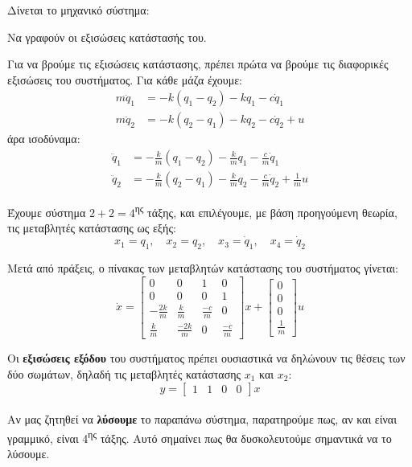 \documentclass[11pt,a4paper,notitlepage,fleqn]{article}
\let\mytodo\todo
\renewcommand{\todo}[1]{\par\mytodo[inline,noline]{#1}}
\begin{document}
\begin{exercise}
	Δίνεται το μηχανικό σύστημα:
	\todo{Graph 22}
	
	Να γραφούν οι εξισώσεις κατάστασής του.
	
	\tcblower
	
	Για να βρούμε τις εξισώσεις κατάστασης, πρέπει πρώτα να βρούμε τις
	διαφορικές εξισώσεις του συστήματος. Για κάθε μάζα έχουμε:
	\begin{align*}
		m\ddot q_1 &= -k(q_1-q_2) - kq_1-c\dot q_1\\
		m\ddot q_2 &= -k(q_2-q_1) - kq_2 -c\dot q_2 + u
	\end{align*}
	άρα ισοδύναμα:
	\begin{align}
	\ddot q_1 &= -\frac{k}{m}(q_1-q_2) - \frac{k}{m}q_1-\frac{c}{m}\dot q_1
	\label{eq:sec4ex1a}
	\\
	\ddot q_2 &= -\frac{k}{m}(q_2-q_1) - \frac{k}{m}q_2 -\frac{c}{m}\dot q_2 + \frac{1}{m}u
	\label{eq:sec4ex1b}
	\end{align}
	
	Έχουμε σύστημα \( 2+2=4 \)\textsuperscript{ης} τάξης, και επιλέγουμε,
	με βάση προηγούμενη θεωρία, τις μεταβλητές κατάστασης ως εξής:
	\[
	x_1=q_1,\quad x_2=q_2,\quad x_3 = \dot q_1,\quad x_4 = \dot q_2
	\]
	
	Μετά από πράξεις, ο πίνακας των μεταβλητών κατάστασης του συστήματος γίνεται:
	\[
	\dot x = \left[\begin{matrix}
	0 & 0 & 1 & 0\\
	0 & 0 & 0 & 1\\
	-\frac{2k}{m} & \frac{k}{m} & \frac{-c}{m} & 0\\
	\frac{k}{m} & \frac{-2k}{m} & 0 & \frac{-c}{m}
	\end{matrix}
	\right]x + \left[
	\begin{matrix}
	0\\ 0\\ 0 \\ \frac{1}{m}
	\end{matrix}\right]u
	\]
	
	Οι \textbf{εξισώσεις εξόδου} του συστήματος πρέπει ουσιαστικά να δηλώνουν τις θέσεις των δύο σωμάτων, δηλαδή τις μεταβλητές κατάστασης
	\( x_1 \) και \( x_2 \):
	\[
	y = \left[\begin{matrix}
	1 & 1 & 0 & 0
	\end{matrix}\right]x
	\]
	
	\paragraph{}
	Αν μας ζητηθεί να \textbf{λύσουμε} το παραπάνω σύστημα, παρατηρούμε πως,
	αν και είναι γραμμικό, είναι 4\textsuperscript{ης} τάξης. Αυτό σημαίνει
	πως θα δυσκολευτούμε σημαντικά να το λύσουμε.
	

\end{exercise}
\end{document}
